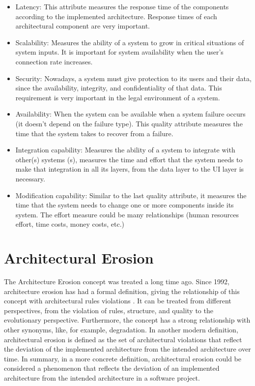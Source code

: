 \begin{itemize}
    \item Latency: This attribute measures the response time of the components according to the implemented architecture. Response times of each architectural component are very important.
    \item Scalability: Measures the ability of a system to grow in critical situations of system inputs. It is important for system availability when the user's connection rate increases.
    \item Security: Nowadays, a system must give protection to its users and their data, since the availability, integrity, and confidentiality of that data. This requirement is very important in the legal environment of a system.
    \item Availability: When the system can be available when a system failure occurs (it doesn't depend on the failure type). This quality attribute measures the time that the system takes to recover from a failure.
    \item Integration capability: Measures the ability of a system to integrate with other(s) systems (s), measures the time and effort that the system needs to make that integration in all its layers, from the data layer to the UI layer is necessary.
    \item Modification capability: Similar to the last quality attribute, it measures the time that the system needs to change one or more components inside its system. The effort measure could be many relationships (human resources effort, time costs, money costs, etc.)
\end{itemize}


\section{Architectural Erosion}
The Architecture Erosion concept was treated a long time ago. Since 1992, architecture erosion has had a formal definition, giving the relationship of this concept with architectural rules violations \citet{perry-wolf-reference}. It can be treated from different perspectives, from the violation of rules, structure, and quality to the evolutionary perspective. Furthermore, the concept has a strong relationship with other synonyms, like, for example, degradation. In another modern definition, architectural erosion is defined as the set of architectural violations that reflect the deviation of the implemented architecture from the intended architecture over time. In summary, in a more concrete definition, architectural erosion could be considered a phenomenon that reflects the deviation of an implemented architecture from the intended architecture in a software project.

